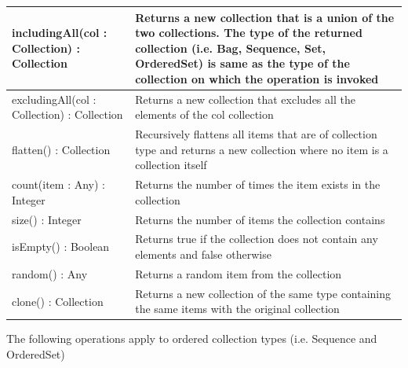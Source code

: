 \begin{longtable} {|p{5.5cm}|p{6.5cm}|}
			includingAll(col : Collection) : Collection & Returns a new collection that is a union of the two collections. The type of the returned collection (i.e. Bag, Sequence, Set, OrderedSet) is same as the type of the collection on which the operation is invoked \\\hline
			
			excludingAll(col : Collection) : Collection & Returns a new collection that excludes all the elements of the col collection \\\hline
			
			flatten() : Collection & Recursively flattens all items that are of collection type and returns a new collection where no item is a collection itself \\\hline
			
			count(item : Any) : Integer & Returns the number of times the item exists in the collection \\\hline
			
			size() : Integer & Returns the number of items the collection contains \\\hline
			
			isEmpty() : Boolean & Returns true if the collection does not contain any elements and false otherwise \\\hline
	
			random() : Any & Returns a random item from the collection \\\hline
			
			clone() : Collection & Returns a new collection of the same type containing the same items with the original collection \\\hline
			
\end{longtable}

The following operations apply to ordered collection types (i.e. Sequence and OrderedSet)

